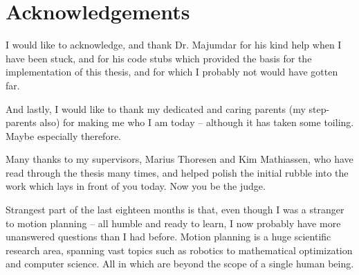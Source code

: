 \chapter{Acknowledgements}

I would like to acknowledge, and thank Dr. Majumdar for his kind help when I
have been stuck, and for his code stubs which provided the basis for the
implementation of this thesis, and for which I probably not would have gotten far.

And lastly, I would like to thank my dedicated and caring parents (my
step-parents also) for making me who I am today -- although it has taken some
toiling. Maybe especially therefore.

Many thanks to my supervisors, Marius Thoresen and Kim Mathiassen, who have read
through the thesis many times, and helped polish the initial rubble into the
work which lays in front of you today. Now you be the judge.

Strangest part of the last eighteen months is that, even though I was a stranger
to motion planning -- all humble and ready to learn, I now probably have more
unanswered questions than I had before. Motion planning is a huge scientific
research area, spanning vast topics such as robotics to mathematical optimization
and computer science. All in which are beyond the scope of a single human being.
